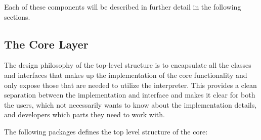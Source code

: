 \documentclass[a4paper, 10pt]{include/compassreport}   %
\begin{document}
Each of these components will be described in further detail in the
following sections.

\subsection{The Core Layer}

The design philosophy of the top-level structure is to encapsulate all
the classes and interfaces that makes up the implementation of the
core functionality and only expose those that are needed to utilize
the interpreter. This provides a clean separation between the
implementation and interface and makes it clear for both the users,
which not necessarily wants to know about the implementation details,
and developers which parts they need to work with.

The following packages defines the top level structure of the core:
\end{document}
